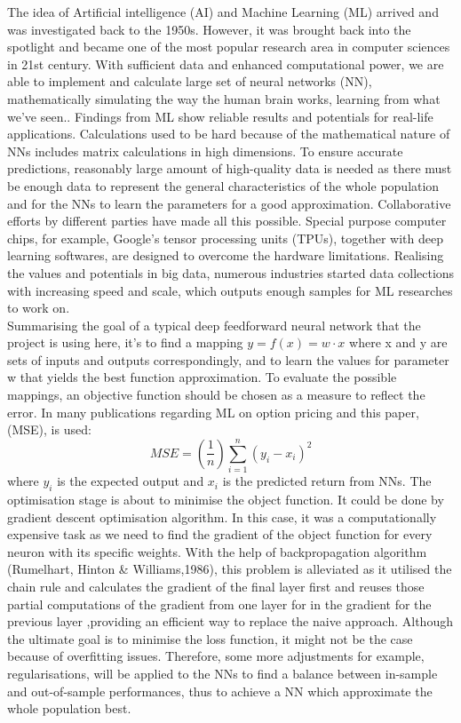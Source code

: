 \documentclass{report}
\begin{document}
The idea of Artificial intelligence (AI) and Machine Learning (ML) arrived and was investigated back to the 1950s. However, it was brought back into the spotlight and became one of the most popular research area in computer sciences in 21st century. With sufficient data and enhanced computational power, we are able to implement and calculate large set of neural networks (NN), mathematically simulating the way the human brain works, learning from what we've seen.. Findings from ML show reliable results and potentials for real-life applications. Calculations used to be hard because of the mathematical nature of NNs includes matrix calculations in high dimensions. To ensure accurate predictions, reasonably large amount of high-quality data is needed as there must be enough data to represent the general characteristics of the whole population and for the NNs to learn the parameters for a good approximation. Collaborative efforts by different parties have made all this possible. Special purpose computer chips, for example, Google's tensor processing units (TPUs), together with deep learning softwares, are designed to overcome the hardware limitations. Realising the values and potentials in big data, numerous industries started data collections with increasing speed and scale, which outputs enough samples for ML researches to work on. \\
Summarising the goal of a typical deep feedforward neural network that the project is using here, it's to find a mapping \(y = f(x) = w \cdot x\) where x and y are sets of inputs and outputs correspondingly, and to learn the values for parameter w that yields the best function approximation. To evaluate the possible mappings, an objective function should be chosen as a measure to reflect the error. In many publications regarding ML on option pricing and this paper,  (MSE), is used: 
\[MSE = (\frac{1}{n})\sum_{i=1}^{n}(y_{i} - x_{i})^{2}\] where \(y_{i}\)  is the expected output and \(x_{i}\) is the predicted return from NNs. The optimisation stage is about to minimise the object function. It could be done by gradient descent optimisation algorithm. In this case, it was a computationally expensive task as we need to find the gradient of the object function for every neuron with its specific weights. With the help of backpropagation algorithm (Rumelhart, Hinton & Williams,1986), this problem is alleviated as it utilised the chain rule and calculates the gradient of the final layer first and reuses those partial computations of the gradient from one layer for in the gradient for the previous layer ,providing an efficient way to replace the naive approach. Although the ultimate goal is to minimise the loss function, it might not be the case because of overfitting issues. Therefore, some more adjustments for example, regularisations, will be applied to the NNs to find a balance between in-sample and out-of-sample performances, thus to achieve a NN which approximate the whole population best. 
\end{document}
